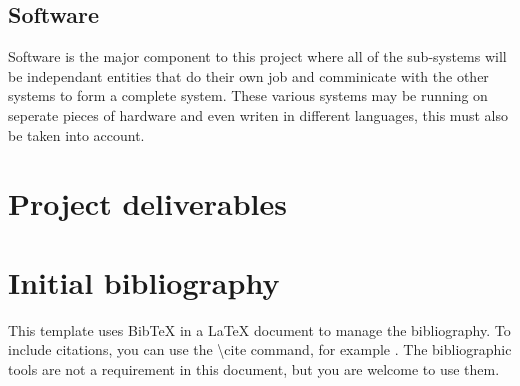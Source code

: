 \documentclass[11pt,fleqn,twoside]{article}
\begin{document}
\subsection{Software}
Software is the major component to this project where all of the sub-systems will be independant entities that do their own job and comminicate with the other systems to form a complete system.  These various systems may be running on seperate pieces of hardware and even writen in different languages, this must also be taken into account.


\section{Project deliverables}


\section{Initial bibliography}

This template uses BibTeX in a LaTeX document to manage the bibliography. To include citations, you 
can use the \textbackslash cite command, for example \cite{NumericalRecipes}\cite{MarksPaper}\cite{FailBlog}\cite{kittenpic_ref}.  The bibliographic tools are not a requirement in this document, but you are welcome to use them.  


\renewcommand{\refname}{}  %
\end{document}
